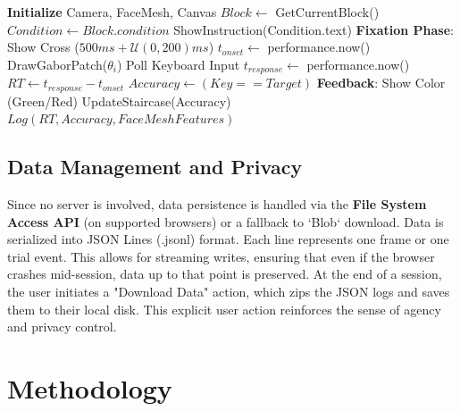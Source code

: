 \documentclass[journal]{IEEEtran}
\begin{document}
\begin{algorithm}
\caption{Camerala Task Loop (Simplified)}
\begin{algorithmic}
\STATE \textbf{Initialize} Camera, FaceMesh, Canvas
    \STATE $Block \leftarrow$ GetCurrentBlock()
    \STATE $Condition \leftarrow Block.condition$
    \STATE ShowInstruction(Condition.text)
        \STATE \textbf{Fixation Phase}: Show Cross ($500ms + \mathcal{U}(0, 200)ms$)
        \STATE $t_{onset} \leftarrow$ performance.now()
        \STATE DrawGaborPatch($\theta_i$)
            \STATE Poll Keyboard Input
        \ENDWHILE
        \STATE $t_{response} \leftarrow$ performance.now()
        \STATE $RT \leftarrow t_{response} - t_{onset}$
        \STATE $Accuracy \leftarrow (Key == Target)$
        \STATE \textbf{Feedback}: Show Color (Green/Red)
        \STATE UpdateStaircase(Accuracy)
        \STATE $Log(RT, Accuracy, FaceMeshFeatures)$
    \ENDFOR
\ENDWHILE
\end{algorithmic}
\end{algorithm}

\subsection{Data Management and Privacy}
Since no server is involved, data persistence is handled via the \textbf{File System Access API} (on supported browsers) or a fallback to `Blob` download.
Data is serialized into JSON Lines (.jsonl) format. Each line represents one frame or one trial event. This allows for streaming writes,
ensuring that even if the browser crashes mid-session, data up to that point is preserved.
At the end of a session, the user initiates a "Download Data" action, which zips the JSON logs and saves them to their local disk.
This explicit user action reinforces the sense of agency and privacy control.

\section{Methodology}
\end{document}
